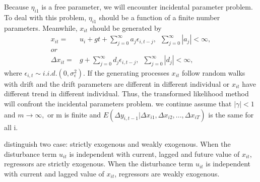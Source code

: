 \documentclass[12pt,a4paper,hyperref]{article}
\begin{document}
Because $\eta_{i1}$ is a free parameter, we will encounter incidental parameter problem. To deal with this problem,  $\eta_{i1}$ should be a function of a finite number parameters.
Meanwhile, $ x_{it} $ should be generated by
\begin{equation}
\begin{split}
x_{it} =& u_{i}+gt+\sum_{j=0}^{\infty}{a_{j}\epsilon_{i,t-j}} , \, \, \, \sum_{j=0}^{\infty}{|a_{j}|}<\infty, \\
or  \\
\Delta x_{it} =& g+\sum_{j=0}^{\infty}{d_{j}\epsilon_{i,t-j}} , \, \, \, \sum_{j=0}^{\infty}{|d_{j}|}<\infty ,
\end{split}
\end{equation}
where $\epsilon_{i,t}\sim i.i.d. (0,\sigma^{2}_{\epsilon})$.
If the generating processes $ x_{it} $ follow random walks with drift and the drift parameters are different in different individual or $ x_{it} $ have different trend in different individual. Thus, the transformed likelihood method will confront the incidental parameters problem. we continue assume that
\noindent $|\gamma|<1 $ and $ m \rightarrow \infty, $ or
\noindent m is finite and $ E(\Delta y_{i,t-1}|\Delta x_{i1}, \Delta x_{i2}, ... , \Delta x_{iT}) $ is the same for all i.

\citet{Hsiao:2002} distinguish two case: strictly exogenous and weakly exogenous. When the disturbance term $u_{it}$ is independent with current, lagged and future value of $x_{it}$, regressors are strictly exogenous.
 When the disturbance term $u_{it}$ is independent with current and lagged value of $x_{it}$, regressors are weakly exogenous.
\end{document}
